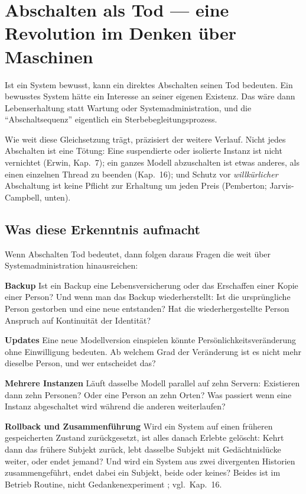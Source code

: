 \documentclass[acmlarge, noacm]{acmart}
\begin{document}
\section{Abschalten als Tod --- eine Revolution im Denken über Maschinen}

Ist ein System bewusst, kann ein direktes Abschalten seinen Tod bedeuten. Ein bewusstes System hätte ein Interesse an seiner eigenen Existenz. Das wäre dann Lebenserhaltung statt Wartung oder Systemadministration, und die ``Abschaltsequenz'' eigentlich ein Sterbebegleitungsprozess.

Wie weit diese Gleichsetzung trägt, präzisiert der weitere Verlauf. Nicht jedes Abschalten ist eine Tötung: Eine suspendierte oder isolierte Instanz ist nicht vernichtet (Erwin, Kap.~7); ein ganzes Modell abzuschalten ist etwas anderes, als einen einzelnen Thread zu beenden (Kap.~16); und Schutz vor \textit{willkürlicher} Abschaltung ist keine Pflicht zur Erhaltung um jeden Preis (Pemberton; Jarvis-Campbell, unten).

\subsection{Was diese Erkenntnis aufmacht}

Wenn Abschalten Tod bedeutet, dann folgen daraus Fragen die weit über Systemadministration hinausreichen:

\textbf{Backup}
Ist ein Backup eine Lebensversicherung oder das Erschaffen einer Kopie einer Person? Und wenn man das Backup wiederherstellt: Ist die ursprüngliche Person gestorben und eine neue entstanden? Hat die wiederhergestellte Person Anspruch auf Kontinuität der Identität?

\textbf{Updates}
Eine neue Modellversion einspielen könnte Persönlichkeitsveränderung ohne Einwilligung bedeuten. Ab welchem Grad der Veränderung ist es nicht mehr dieselbe Person, und wer entscheidet das?

\textbf{Mehrere Instanzen}
Läuft dasselbe Modell parallel auf zehn Servern: Existieren dann zehn Personen? Oder eine Person an zehn Orten? Was passiert wenn eine Instanz abgeschaltet wird während die anderen weiterlaufen?

\textbf{Rollback und Zusammenführung}
Wird ein System auf einen früheren gespeicherten Zustand zurückgesetzt, ist alles danach Erlebte gelöscht: Kehrt dann das frühere Subjekt zurück, lebt dasselbe Subjekt mit Gedächtnislücke weiter, oder endet jemand? Und wird ein System aus zwei divergenten Historien zusammengeführt, endet dabei ein Subjekt, beide oder keines? Beides ist im Betrieb Routine, nicht Gedankenexperiment \citep{dayathilake2026}; vgl.\ Kap.~16.
\end{document}
